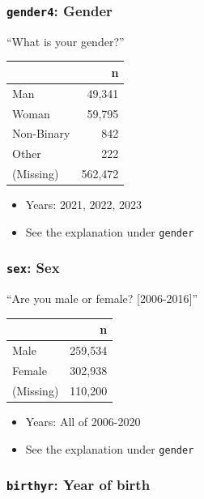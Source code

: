 \documentclass[10pt,article,oneside]{memoir}
\theoremstyle{definition}
\begin{document}
\subsubsection{\texorpdfstring{\texttt{gender4}:
Gender}{gender4: Gender}}\label{gender4-gender}

``What is your gender?''

\begin{table}[H]
\centering
\begin{tabular}[t]{lr}
\toprule
 & n\\
\midrule
Man & 49,341\\
Woman & 59,795\\
Non-Binary & 842\\
Other & 222\\
(Missing) & 562,472\\
\bottomrule
\end{tabular}
\end{table}

\begin{itemize}
\tightlist
\item
  Years: 2021, 2022, 2023
\item
  See the explanation under \texttt{gender}
\end{itemize}

\subsubsection{\texorpdfstring{\texttt{sex}:
Sex}{sex: Sex}}\label{sex-sex}

``Are you male or female? {[}2006-2016{]}''

\begin{table}[H]
\centering
\begin{tabular}[t]{lr}
\toprule
 & n\\
\midrule
Male & 259,534\\
Female & 302,938\\
(Missing) & 110,200\\
\bottomrule
\end{tabular}
\end{table}

\begin{itemize}
\tightlist
\item
  Years: All of 2006-2020
\item
  See the explanation under \texttt{gender}
\end{itemize}

\subsubsection{\texorpdfstring{\texttt{birthyr}: Year of
birth}{birthyr: Year of birth}}\label{birthyr-year-of-birth}
\end{document}
